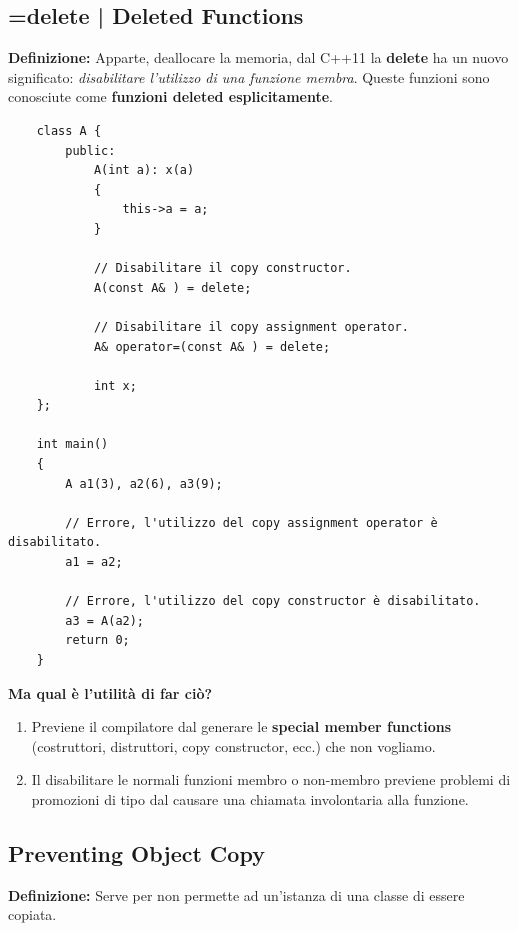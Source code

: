 \subsection{=delete | Deleted Functions}

\textsf{\small \textbf{Definizione: } Apparte, deallocare la memoria, dal C++11 la \textbf{delete} ha un nuovo significato: \emph{disabilitare l'utilizzo di una funzione membra}. Queste funzioni sono conosciute come \textbf{funzioni deleted esplicitamente}.} \\

\begin{lstlisting}
	class A {
		public:
			A(int a): x(a)
			{
				this->a = a;
			}
		
			// Disabilitare il copy constructor.
			A(const A& ) = delete;
			
			// Disabilitare il copy assignment operator.
			A& operator=(const A& ) = delete;
			
			int x;
	};

	int main()
	{
		A a1(3), a2(6), a3(9);
		
		// Errore, l'utilizzo del copy assignment operator è disabilitato.
		a1 = a2;
		
		// Errore, l'utilizzo del copy constructor è disabilitato.
		a3 = A(a2);
		return 0;
	}
\end{lstlisting}

\textsf{\small \textbf{Ma qual è l'utilità di far ciò?}} \\

\begin{enumerate}
	\item \textsf{\small Previene il compilatore dal generare le \textbf{special member functions} (costruttori, distruttori, copy constructor, ecc.) che non vogliamo.} \\
	\item \textsf{\small Il disabilitare le normali funzioni membro o non-membro previene problemi di promozioni di tipo dal causare una chiamata involontaria alla funzione.} \\
\end{enumerate}

\subsection{Preventing Object Copy}

\textsf{\small \textbf{Definizione: } Serve per non permette ad un'istanza di una classe di essere copiata.} \\

